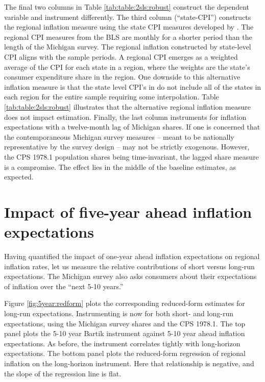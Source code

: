 \documentclass[12pt]{article}
\begin{document}
The final two columns in Table \ref{tab:table:2sls:robust} construct the dependent variable and instrument differently. The third column (``state-CPI'') constructs the regional inflation measure using the state CPI measures developed by \cite{NakamuraSteinsson:QJE2022}. The regional CPI measures from the BLS are monthly for a shorter period than the length of the Michigan survey. The regional inflation constructed by state-level CPI aligns with the sample periods. A regional CPI emerges as a weighted average of the CPI for each state in a region, where the weights are the state's consumer expenditure share in the region. One downside to this alternative inflation measure is that the state level CPI's in \cite{NakamuraSteinsson:QJE2022} do not include all of the states in each region for the entire sample requiring some interpolation. Table \ref{tab:table:2sls:robust} illustrates that the alternative regional inflation measure does not impact estimation. Finally, the last column instruments for inflation expectations with a twelve-month lag of Michigan shares. If one is concerned that the contemporaneous Michigan survey measures -- meant to be nationally representative by the survey design -- may not be strictly exogenous. However, the CPS 1978.1 population shares being time-invariant, the lagged share measure is a compromise. The effect lies in the middle of the baseline estimates, as expected.


\section{Impact of five-year ahead inflation expectations}


Having quantified the impact of one-year ahead inflation expectations on regional inflation rates, let us measure the relative contributions of short versus long-run expectations. The Michigan survey also asks consumers about their expectations of inflation over the ``next 5-10 years.'' 

Figure \ref{fig:5year:redform} plots the corresponding reduced-form estimates for long-run expectations. Instrumenting is now for both short- and long-run expectations, using the Michigan survey shares and the CPS 1978.1. The top panel plots the 5-10 year Bartik instrument against 5-10 year ahead inflation expectations. As before, the instrument correlates tightly with long-horizon expectations. The bottom panel plots the reduced-form regression of regional inflation on the long-horizon instrument. Here that relationship is negative, and the slope of the regression line is flat.  
\end{document}
